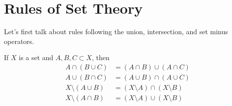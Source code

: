 \section{Rules of Set Theory} 

  Let's first talk about rules following the union, intersection, and set minus operators. 

  \begin{theorem}
    If $X$ is a set and $A,B,C \subset X$, then 
    \begin{align}
      A \cap (B \cup C) & = (A \cap B) \cup (A \cap C) \\
      A \cup (B \cap C) & = (A \cup B) \cap (A \cup C) \\ 
      X \setminus (A \cup B) & = (X \setminus A) \cap (X \setminus B) \\
      X \setminus (A \cap B) & = (X \setminus A) \cup (X \setminus B)
    \end{align}
  \end{theorem}
